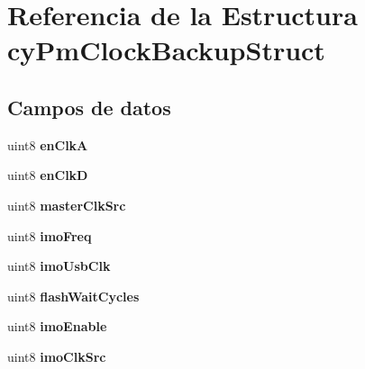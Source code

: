 \hypertarget{structcy_pm_clock_backup_struct}{}\section{Referencia de la Estructura cy\+Pm\+Clock\+Backup\+Struct}
\label{structcy_pm_clock_backup_struct}
\subsection*{Campos de datos}
\begin{DoxyCompactItemize}
\item 
\mbox{\label{structcy_pm_clock_backup_struct_a7be7a3b6a12a837b8475be232ac51a48}} 
uint8 {\bfseries en\+ClkA}
\item 
\mbox{\label{structcy_pm_clock_backup_struct_a3c79e105ee3ede47a70df8de7025defa}} 
uint8 {\bfseries en\+ClkD}
\item 
\mbox{\label{structcy_pm_clock_backup_struct_a3f903c77ac273fd04cbf5830f45ddd2b}} 
uint8 {\bfseries master\+Clk\+Src}
\item 
\mbox{\label{structcy_pm_clock_backup_struct_a4ff9b28a544cc30813552c7e24d9d10b}} 
uint8 {\bfseries imo\+Freq}
\item 
\mbox{\label{structcy_pm_clock_backup_struct_aa55102f0369b5d7c860b80ba145719d7}} 
uint8 {\bfseries imo\+Usb\+Clk}
\item 
\mbox{\label{structcy_pm_clock_backup_struct_ad940d4c4ce6200707dec38e7b6b81a86}} 
uint8 {\bfseries flash\+Wait\+Cycles}
\item 
\mbox{\label{structcy_pm_clock_backup_struct_a5bb384de660eea159233e610fbe386b4}} 
uint8 {\bfseries imo\+Enable}
\item 
\mbox{\label{structcy_pm_clock_backup_struct_abd31b743e2a00c52544b8dd08686be3c}} 
uint8 {\bfseries imo\+Clk\+Src}
\item 

\end{DoxyCompactItemize}
